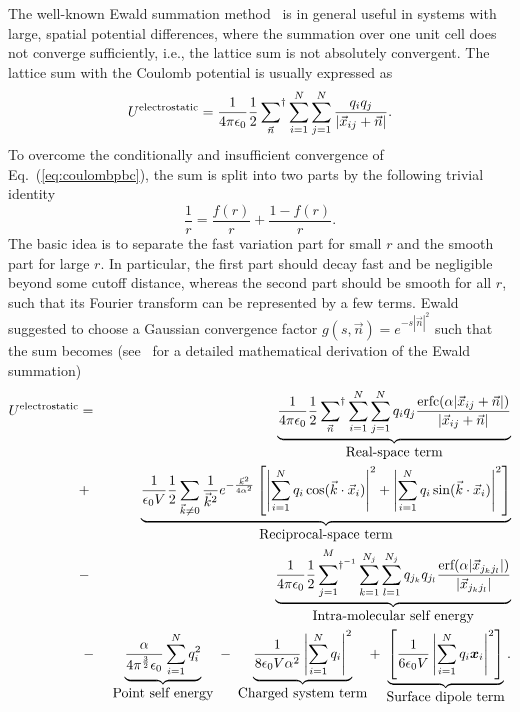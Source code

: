 \documentclass[11pt]{article}
\newcommand{\erf}{\mbox{erf}}
\newcommand{\erfc}{\mbox{erfc}}
\providecommand{\bm}[1]{\mbox{\boldmath${#1}$}}
\providecommand{\textinmath}[1]{\mbox{#1}}
\providecommand{\textinmathss}[1]{\mbox{\scriptsize #1}}
\begin{document}
The well-known Ewald summation method~\cite{Ewal21} is in
general useful in systems with large, spatial potential differences,
where the summation over one unit cell does not converge sufficiently,
i.e., the lattice sum is not absolutely convergent. The lattice sum
with the Coulomb potential is usually expressed as
\begin{equation}
\label{eq:coulombpbc}
U^{\textinmathss{electrostatic}} =\frac{1}{4 \pi \epsilon_0} \frac{1}{2}\sideset{}{^\dag}\sum_{\vec{n}}
\sum_{i=1}^{N}\sum_{j=1}^{N} \frac{q_{i}q_{j}}{| \vec{x}_{ij} +  \vec{n} |}.
\end{equation}
To overcome the conditionally and insufficient convergence of
Eq.\ (\ref{eq:coulombpbc}), the sum is split into two parts by the following trivial
identity 
\begin{equation}
\label{eq:identity}
\frac{1}{r} = \frac{f(r)}{r} + \frac{1-f(r)}{r}.
\end{equation}
The basic idea is to separate the fast variation part for small $r$ and
the smooth part for large $r$. In particular, the first part should decay
fast and be negligible beyond some cutoff distance, whereas the second part should
be smooth for all $r$, such that its Fourier transform can be
represented by a few terms. Ewald~\cite{Ewal21} suggested to
choose a Gaussian convergence factor $g(s,\vec{n}) = e^{-s|\vec{n}|^2}$
such that the sum becomes (see~\cite{LPSm80} for a detailed mathematical
derivation of the Ewald summation)
%
\begin{eqnarray}
\label{eq:ewald}
U^{\textinmathss{electrostatic}} & = & \underbrace{\frac{1}{4 \pi \epsilon_0} \frac{1}{2}\sideset{}{^\dag}\sum_{\vec{n}}
\sum_{i=1}^{N}\sum_{j=1}^{N}  q_{i}q_{j} \frac{\erfc (\alpha | \vec{x}_{ij}
+  \vec{n} |)}{| \vec{x}_{ij} +  \vec{n} |}}_{\textinmath{Real-space
term}}\nonumber\\
& + & \underbrace{\frac{1}{\epsilon_0 V}\frac{1}{2}\sum_{\vec{k} \neq
0}\frac{1}{\vec{k}^2}e^{-\frac{\vec{k}^2}{4 \alpha^2}}\left [ \left |
\sum_{i=1}^{N} q_i \cos (\vec{k} \cdot \vec{x}_i) \right |^2 + \left |
\sum_{i=1}^{N} q_i \sin (\vec{k} \cdot \vec{x}_i) \right |^2 \right
]}_{\textinmath{Reciprocal-space term}}\nonumber\\
& - & \underbrace{\frac{1}{4 \pi \epsilon_0} \frac{1}{2} \sideset{}{^{\dag ^{-1}}}\sum_{j=1}^{M}
\sum_{k=1}^{N_j} \sum_{l=1}^{N_j}  q_{j_k} q_{j_l}
\frac{\erf( \alpha | \vec{x}_{j_k j_l} |)}{|
\vec{x}_{j_k j_l}| }}_{\textinmath{Intra-molecular self energy}}\\
&~-~& \underbrace{\frac{\alpha}{4 \pi^\frac{3}{2}
\epsilon_0}\sum_{i=1}^{N} q_i^2}_{\textinmath{Point
self energy}} ~-~  \underbrace{\frac{1}{8 \epsilon_0 V \alpha ^2} \left |
\sum_{i=1}^N q_i \right |^2}_{\textinmath{Charged system term}} +
\; \underbrace{\left [  \frac{1}{6 \epsilon_0 V} 
                    \left | \sum_{i=1}^N q_i \bm{x}_i 
                    \right |^2 \right ]}_{\textinmath{Surface dipole term}}.\nonumber
\end{eqnarray}
\end{document}
